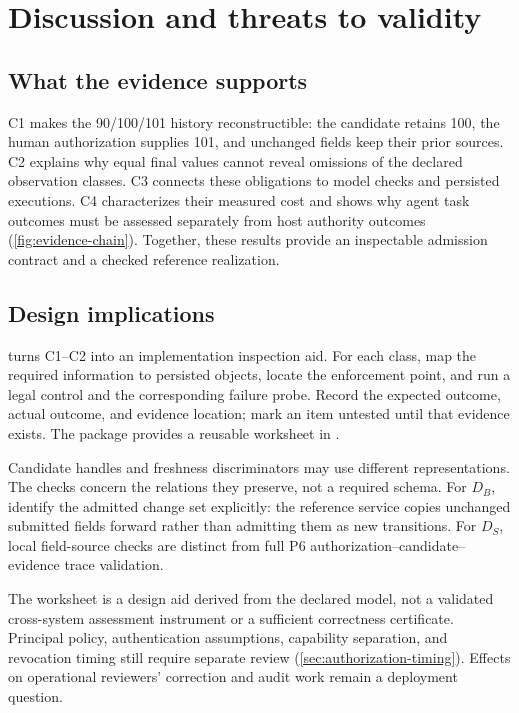 \section{Discussion and threats to validity}
\label{sec:discussion}

\subsection{What the evidence supports}

C1 makes the 90/100/101 history reconstructible: the candidate retains 100, the human authorization supplies 101, and unchanged fields keep their prior sources. C2 explains why equal final values cannot reveal omissions of the declared observation classes. C3 connects these obligations to model checks and persisted executions. C4 characterizes their measured cost and shows why agent task outcomes must be assessed separately from host authority outcomes (\cref{fig:evidence-chain}). Together, these results provide an inspectable admission contract and a checked reference realization.

\subsection{Design implications}

 turns C1--C2 into an implementation inspection aid. For each class, map the required information to persisted objects, locate the enforcement point, and run a legal control and the corresponding failure probe. Record the expected outcome, actual outcome, and evidence location; mark an item untested until that evidence exists. The package provides a reusable worksheet in .

Candidate handles and freshness discriminators may use different representations. The checks concern the relations they preserve, not a required schema. For $D_B$, identify the admitted change set explicitly: the reference service copies unchanged submitted fields forward rather than admitting them as new transitions. For $D_S$, local field-source checks are distinct from full P6 authorization--candidate--evidence trace validation.



The worksheet is a design aid derived from the declared model, not a validated cross-system assessment instrument or a sufficient correctness certificate. Principal policy, authentication assumptions, capability separation, and revocation timing still require separate review (\cref{sec:authorization-timing}). Effects on operational reviewers' correction and audit work remain a deployment question.


